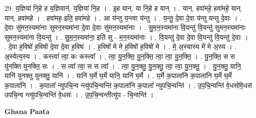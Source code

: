 \documentclass[17pt]{extarticle}
\begin{document}
29. य॒ज्ञिया॑ नि॒हे ह य॒ज्ञियान्॑. य॒ज्ञिया॑ नि॒ह । . इ॒ह यान्. या नि॒हे ह यान् । . यान्. हवा॑महे॒ हवा॑महे॒ यान्. यान्. हवा॑महे । . हवा॑मह॒ इति॒ हवा॑महे । . आ य॑न्तु य॒न्त्वा य॑न्तु । . य॒न्तु॒ दे॒वा दे॒वा य॑न्तु यन्तु दे॒वाः । . दे॒वाः सु॑मन॒स्यमा॑नाः सुमन॒स्यमा॑ना दे॒वा दे॒वाः सु॑मन॒स्यमा॑नाः । . सु॒म॒न॒स्यमा॑ना वि॒यन्तु॑ वि॒यन्तु॑ सुमन॒स्यमा॑नाः सुमन॒स्यमा॑ना वि॒यन्तु॑ । . सु॒म॒न॒स्यमा॑ना॒ इति॑ सु - म॒न॒स्यमा॑नाः । . वि॒यन्तु॑ दे॒वा दे॒वा वि॒यन्तु॑ वि॒यन्तु॑ दे॒वाः । . दे॒वा ह॒विषो॑ ह॒विषो॑ दे॒वा दे॒वा ह॒विषः॑ । . ह॒विषो॑ मे मे ह॒विषो॑ ह॒विषो॑ मे । . मे॒ अ॒स्यास्य मे॑ मे अ॒स्य । . अ॒स्येत्य॒स्य । . कस्त्वा᳚ त्वा॒ कः कस्त्वा᳚ । . त्वा॒ यु॒न॒क्ति॒ यु॒न॒क्ति॒ त्वा॒ त्वा॒ यु॒न॒क्ति॒ । . यु॒न॒क्ति॒ स स यु॑नक्ति युनक्ति॒ सः । . स त्वा᳚ त्वा॒ स स त्वा᳚ । . त्वा॒ यु॒न॒क्तु॒ यु॒न॒क्तु॒ त्वा॒ त्वा॒ यु॒न॒क्तु॒ । . यु॒न॒क्तु॒ यानि॒ यानि॑ युनक्तु युनक्तु॒ यानि॑ । . यानि॑ घ॒र्मे घ॒र्मे यानि॒ यानि॑ घ॒र्मे । . घ॒र्मे क॒पाला॑नि क॒पाला॑नि घ॒र्मे घ॒र्मे क॒पाला॑नि । . क॒पाला᳚ न्युपचि॒न्व न्त्यु॑पचि॒न्वन्ति॑ क॒पाला॑नि क॒पाला᳚ न्युपचि॒न्वन्ति॑ । . उ॒प॒चि॒न्वन्ति॑ वे॒धसो॑वे॒धस॑ उपचि॒न्व न्त्यु॑पचि॒न्वन्ति॑ वे॒धसः॑ । . उ॒प॒चि॒न्वन्तीत्यु॑प - चि॒न्वन्ति॑ । \newline

\textbf{Ghana Paata } \newline
\end{document}
